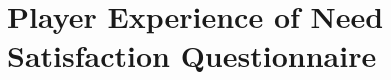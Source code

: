 \documentclass{uofsthesis-cs}
\begin{document}
\chapter{Player Experience of Need Satisfaction Questionnaire}            \label{app:q-pens}        \noindent{}

\end{document}
